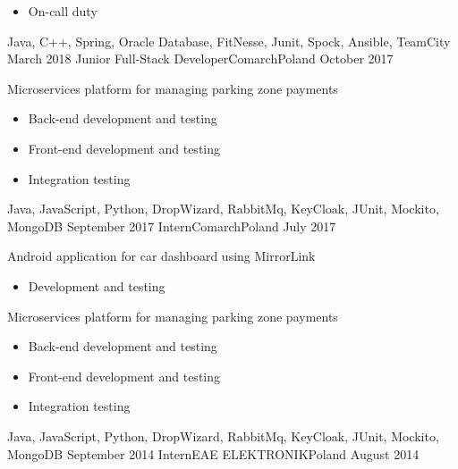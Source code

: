 \begin{experiences}
{\begin{itemize}
                            \item On-call duty
                        \end{itemize}
                    }
                    {Java, C++, Spring, Oracle Database, FitNesse, Junit, Spock, Ansible, TeamCity}
  \emptySeparator
  \experience
    {March 2018}     {Junior Full-Stack Developer}{Comarch}{Poland}
    {October 2017}    {
                        Microservices platform for managing parking zone payments
                        \begin{itemize}
                            \item Back-end development and testing
                            \item Front-end development and testing
                            \item Integration testing
                        \end{itemize}
                    }
                    {Java, JavaScript, Python, DropWizard, RabbitMq, KeyCloak, JUnit, Mockito, MongoDB}
  \emptySeparator
  \experience
  {September 2017}       {Intern}{Comarch}{Poland}
  {July 2017}      {
                        Android application for car dashboard using MirrorLink
                        \begin{itemize}
                            \item Development and testing
                        \end{itemize}
                        Microservices platform for managing parking zone payments
                        \begin{itemize}
                            \item Back-end development and testing
                            \item Front-end development and testing
                            \item Integration testing
                        \end{itemize}
                    }
                    {Java, JavaScript, Python, DropWizard, RabbitMq, KeyCloak, JUnit, Mockito, MongoDB}
  \emptySeparator
  \emptyexperience
  {September 2014}      {Intern}{EAE ELEKTRONIK}{Poland}
  {August 2014}      

\end{experiences}
